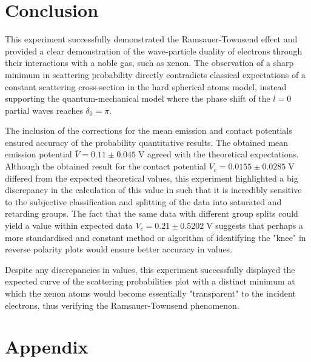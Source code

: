 \documentclass[11pt, a4paper, twocolumn]{article}
\begin{document}
\section{Conclusion}

This experiment successfully demonstrated the Ramsauer-Townsend effect and provided a clear demonstration of the wave-particle duality of electrons through their interactions with a noble gas, such as xenon. The observation of a sharp minimum in scattering probability directly contradicts classical expectations of a constant scattering cross-section in the hard spherical atoms model, instead supporting the quantum-mechanical model where the phase shift of the $l=0$ partial waves reaches $\delta_0=\pi$.

The inclusion of the corrections for the mean emission and contact potentials ensured accuracy of the probability quantitative results. The obtained mean emission potential $\bar{V}=0.11\pm 0.045 \; \text{V}$ agreed with the theoretical expectations. Although the obtained result for the contact potential $V_c = 0.0155 \pm 0.0285\; \text{V}$ differed from the expected theoretical values, this experiment highlighted a big discrepancy in the calculation of this value in such that it is incredibly sensitive to the subjective classification and splitting of the data into saturated and retarding groups. The fact that the same data with different group splits could yield a value within expected data $V_c = 0.21 \pm 0.5202 \;\text{V}$ suggests that perhaps a more standardised and constant method or algorithm of identifying the "knee" in reverse polarity plots would ensure better accuracy in values.

Despite any discrepancies in values, this experiment successfully displayed the expected curve of the scattering probabilities plot with a distinct minimum at which the xenon atoms would become essentially "transparent" to the incident electrons, thus verifying the Ramsauer-Townsend phenomenon.


\onecolumn


 \label{sec:ref}

\newpage

\section*{Appendix} \label{sec:A}
\end{document}
